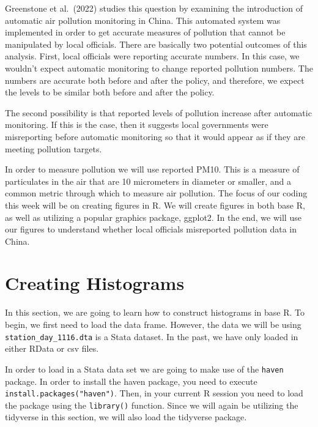 \documentclass[
]{book}
\begin{document}
Greenstone et al.~(2022)\citep{greenstone2022can} studies this question by examining the introduction of automatic air pollution monitoring in China. This automated system was implemented in order to get accurate measures of pollution that cannot be manipulated by local officials. There are basically two potential outcomes of this analysis. First, local officials were reporting accurate numbers. In this case, we wouldn't expect automatic monitoring to change reported pollution numbers. The numbers are accurate both before and after the policy, and therefore, we expect the levels to be similar both before and after the policy.

The second possibility is that reported levels of pollution increase after automatic monitoring. If this is the case, then it suggests local governments were misreporting before automatic monitoring so that it would appear as if they are meeting pollution targets.

In order to measure pollution we will use reported PM10. This is a measure of particulates in the air that are 10 micrometers in diameter or smaller, and a common metric through which to measure air pollution. The focus of our coding this week will be on creating figures in R. We will create figures in both base R, as well as utilizing a popular graphics package, ggplot2. In the end, we will use our figures to understand whether local officials misreported pollution data in China.

\section{Creating Histograms}\label{creating-histograms}

In this section, we are going to learn how to construct histograms in base R. To begin, we first need to load the data frame. However, the data we will be using \texttt{station\_day\_1116.dta} is a Stata dataset. In the past, we have only loaded in either RData or csv files.

In order to load in a Stata data set we are going to make use of the \texttt{haven} package. In order to install the haven package, you need to execute \texttt{install.packages("haven")}. Then, in your current R session you need to load the package using the \texttt{library()} function. Since we will again be utilizing the tidyverse in this section, we will also load the tidyverse package.
\end{document}
